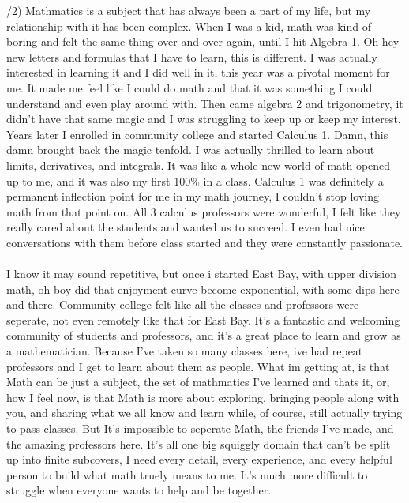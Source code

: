 \documentclass[10pt]{article}
\begin{document}
\noindent
\begin{doublespacing}
/2) Mathmatics is a subject that has always been a part of my life, but my relationship with it has been complex. 
When I was a kid, math was kind of boring and felt the same thing over and over again, until I hit Algebra 1.
Oh hey new letters and formulas that I have to learn, this is different. I was actually interested in learning it
and I did well in it, this year was a pivotal moment for me. It made me feel like I could do math and that it was something 
I could understand and even play around with. Then came algebra 2 and trigonometry, it didn't have that same magic and
I was struggling to keep up or keep my interest. Years later I enrolled in community college and started Calculus 1.
Damn, this damn brought back the magic tenfold. I was actually thrilled to learn about limits, derivatives, and integrals. 
It was like a whole new world of math opened up to me, and it was also my first 100\% in a class. Calculus 1 was 
definitely a permanent inflection point for me in my math journey, I couldn't stop loving math from that point on. 
All 3 calculus professors were wonderful, I felt like they really cared about the students and wanted us to succeed. 
I even had nice conversations with them before class started and they were constantly passionate.
\\\\
I know it may sound repetitive, but once i started East Bay, with upper division math, oh boy did
that enjoyment curve become exponential, with some dips here and there. Community college felt like all the
classes and professors were seperate, not even remotely like that for East Bay. It's a fantastic and 
welcoming community of students and professors, and it's a great place to learn and grow as a mathematician.
Because I've taken so many classes here, ive had repeat professors and I get to learn about them as people.
What im getting at, is that Math can be just a subject, the set of mathmatics I've learned and thats it,
or, how I feel now, is that Math is more about exploring, bringing people along with you, and sharing what
we all know and learn while, of course, still actually trying to pass classes. But It's impossible to
seperate Math, the friends I've made, and the amazing professors here. It's all one big squiggly domain that
can't be split up into finite subcovers, I need every detail, every experience, and every helpful person to
build what math truely means to me. It's much more difficult to struggle when everyone wants to help and be together.

\end{doublespacing}
\end{document}
